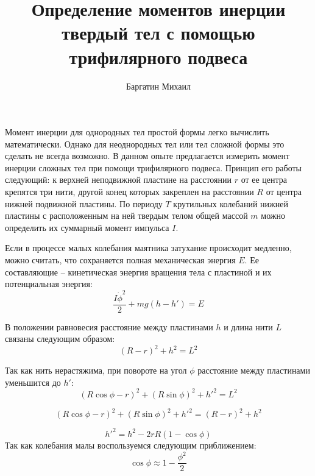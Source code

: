 \documentclass{article}
\title{Определение моментов инерции твердый тел с помощью трифилярного подвеса}
\date{}
\author{Баргатин Михаил}
\begin{document}
    \maketitle
    \newpage

    Момент инерции для однородных тел простой формы легко вычислить математически.
    Однако для неоднородных тел или тел сложной формы это сделать не всегда возможно.
    В данном опыте предлагается измерить момент инерции сложных тел при помощи трифилярного подвеса.
    Принцип его работы следующий: к верхней неподвижной пластине на расстоянии $r$ от ее центра крепятся три
    нити, другой конец которых закреплен на расстоянии $R$ от центра нижней подвижной пластины. По периоду $T$
    крутильных колебаний нижней пластины с расположенным на ней твердым телом общей массой $m$
    можно определить их суммарный момент импульса $I$.
    
    Если в процессе малых колебания маятника затухание происходит медленно,
    можно считать, что сохраняется полная механическая энергия $E$. Ее составляющие -- 
    кинетическая энергия вращения тела с пластиной и их потенциальная энергия:
    \begin{equation}
        \frac {I \dot \phi^2} {2} + mg(h - h') = E
    \end{equation}

    В положении равновесия расстояние между пластинами $h$ и длина нити $L$ связаны следующим образом:
    \begin{equation}
        (R - r)^2 + h^2 = L^2
    \end{equation}

    Так как нить нерастяжима, при повороте на угол $\phi$ расстояние между пластинами уменьшится до $h'$:
    \begin{equation}
        (R \cos \phi - r)^2 + (R \sin \phi)^2 + h'^2 = L^2
    \end{equation}

    \begin{equation}
        (R \cos \phi - r)^2 + (R \sin \phi)^2 + h'^2 = (R - r)^2 + h^2 
    \end{equation}

    \begin{equation}
        h'^2 = h^2 - 2rR(1 - \cos \phi) \end{equation}
    Так как колебания малы воспользуемся следующим приближением:
    \begin{equation*}
        \cos \phi \approx 1 - \frac {\phi^2} {2}
    \end{equation*}
\end{document}
